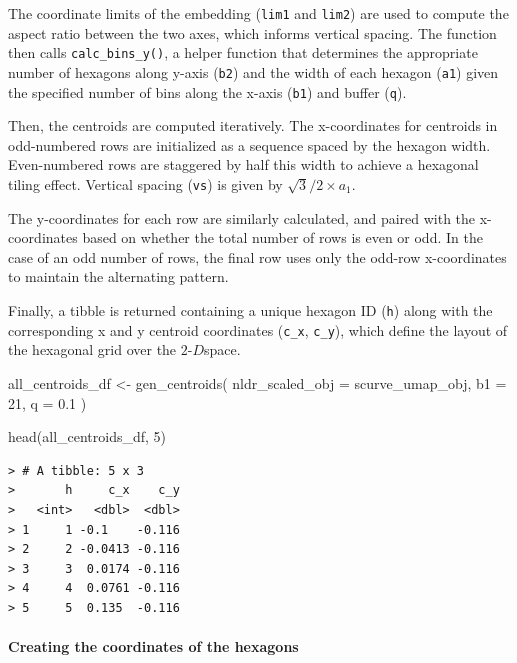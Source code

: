 \documentclass[
  11pt,
  a4paper,
]{report}
\newenvironment{Shaded}{\begin{snugshade}}{\end{snugshade}}
\newcommand{\AttributeTok}[1]{\textcolor[rgb]{0.40,0.45,0.13}{#1}}
\newcommand{\DecValTok}[1]{\textcolor[rgb]{0.68,0.00,0.00}{#1}}
\newcommand{\FloatTok}[1]{\textcolor[rgb]{0.68,0.00,0.00}{#1}}
\newcommand{\FunctionTok}[1]{\textcolor[rgb]{0.28,0.35,0.67}{#1}}
\newcommand{\NormalTok}[1]{\textcolor[rgb]{0.00,0.23,0.31}{#1}}
\newcommand{\OtherTok}[1]{\textcolor[rgb]{0.00,0.23,0.31}{#1}}
\newcommand{\twoD}{$2\text{-}D$}
\begin{document}
The coordinate limits of the embedding (\texttt{lim1} and \texttt{lim2})
are used to compute the aspect ratio between the two axes, which informs
vertical spacing. The function then calls \texttt{calc\_bins\_y()}, a
helper function that determines the appropriate number of hexagons along
y-axis (\texttt{b2}) and the width of each hexagon (\texttt{a1}) given
the specified number of bins along the x-axis (\texttt{b1}) and buffer
(\texttt{q}).

Then, the centroids are computed iteratively. The x-coordinates for
centroids in odd-numbered rows are initialized as a sequence spaced by
the hexagon width. Even-numbered rows are staggered by half this width
to achieve a hexagonal tiling effect. Vertical spacing (\texttt{vs}) is
given by \(\sqrt{3}/2 \times a_1\).

The y-coordinates for each row are similarly calculated, and paired with
the x-coordinates based on whether the total number of rows is even or
odd. In the case of an odd number of rows, the final row uses only the
odd-row x-coordinates to maintain the alternating pattern.

Finally, a tibble is returned containing a unique hexagon ID
(\texttt{h}) along with the corresponding x and y centroid coordinates
(\texttt{c\_x}, \texttt{c\_y}), which define the layout of the hexagonal
grid over the \twoD space.

\begin{Shaded}
\begin{Highlighting}[]
\NormalTok{all\_centroids\_df }\OtherTok{\textless{}{-}} \FunctionTok{gen\_centroids}\NormalTok{(}
  \AttributeTok{nldr\_scaled\_obj =}\NormalTok{ scurve\_umap\_obj, }
  \AttributeTok{b1 =} \DecValTok{21}\NormalTok{, }
  \AttributeTok{q =} \FloatTok{0.1}
\NormalTok{  )}

\FunctionTok{head}\NormalTok{(all\_centroids\_df, }\DecValTok{5}\NormalTok{)}
\end{Highlighting}
\end{Shaded}

\begin{verbatim}
> # A tibble: 5 x 3
>       h     c_x    c_y
>   <int>   <dbl>  <dbl>
> 1     1 -0.1    -0.116
> 2     2 -0.0413 -0.116
> 3     3  0.0174 -0.116
> 4     4  0.0761 -0.116
> 5     5  0.135  -0.116
\end{verbatim}

\paragraph{Creating the coordinates of the
hexagons}\label{creating-the-coordinates-of-the-hexagons}
\end{document}
